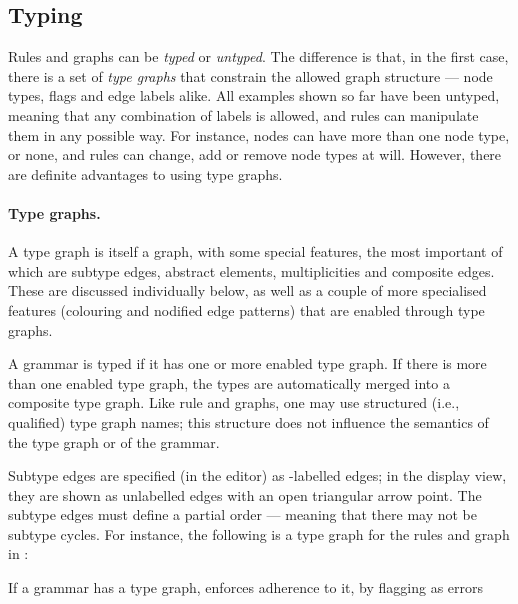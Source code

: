 \subsection{Typing}

Rules and graphs can be \emph{typed} or \emph{untyped}. The difference is that,
in the first case, there is a set of \emph{type graphs} that constrain the
allowed graph structure --- node types, flags and edge labels alike. All
examples shown so far have been untyped, meaning that any combination of labels
is allowed, and rules can manipulate them in any possible way. For instance,
nodes can have more than one node type, or none, and rules can change, add or
remove node types at will. However, there are definite advantages to using type
graphs.

\paragraph{Type graphs.}

A type graph is itself a graph, with some special features, the most important
of which are subtype edges, abstract elements, multiplicities and composite
edges. These are discussed individually below, as well as a couple of more
specialised features (colouring and nodified edge patterns) that are enabled
through type graphs.

A grammar is typed if it has one or more enabled type graph. If there is more
than one enabled type graph, the types are automatically merged into a
composite type graph. Like rule and graphs, one may use structured (i.e.,
qualified) type graph names; this structure does not influence the semantics of
the type graph or of the grammar.

Subtype edges are specified (in the editor) as \subP-labelled edges; in
the display view, they are shown as unlabelled edges with an open triangular
arrow point. The subtype edges must define a partial order --- meaning that
there may not be subtype cycles. For instance, the following is a type graph
for the rules and graph in :

%
If a grammar has a type graph, \GROOVE enforces adherence to it, by flagging as
errors

